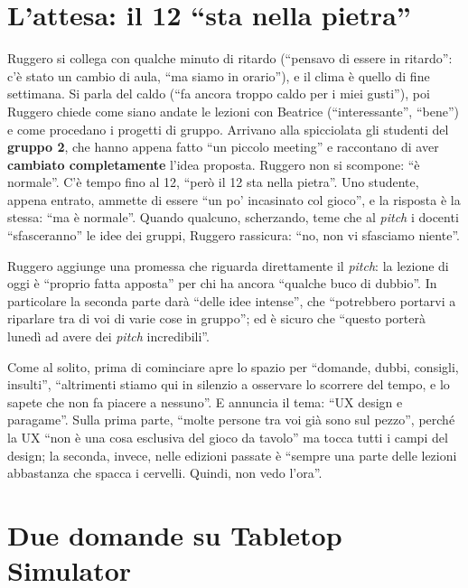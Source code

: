\section{L'attesa: il 12 ``sta nella pietra''}
\label{a10:sec:attesa}

Ruggero si collega con qualche minuto di ritardo (``pensavo di essere in ritardo'':
c'è stato un cambio di aula, ``ma siamo in orario''), e il clima è quello di fine
settimana. Si parla del caldo (``fa ancora troppo caldo per i miei gusti''), poi
Ruggero chiede come siano andate le lezioni con Beatrice (``interessante'',
``bene'') e come procedano i progetti di gruppo. Arrivano alla spicciolata gli
studenti del \textbf{gruppo 2}, che hanno appena fatto ``un piccolo meeting'' e
raccontano di aver \textbf{cambiato completamente} l'idea proposta. Ruggero non si
scompone: ``è normale''. C'è tempo fino al 12, ``però il 12 sta nella pietra''. Uno
studente, appena entrato, ammette di essere ``un po' incasinato col gioco'', e la
risposta è la stessa: ``ma è normale''. Quando qualcuno, scherzando, teme che al
\emph{pitch} i docenti ``sfasceranno'' le idee dei gruppi, Ruggero rassicura: ``no, non
vi sfasciamo niente''.

Ruggero aggiunge una promessa che riguarda direttamente il \emph{pitch}: la lezione
di oggi è ``proprio fatta apposta'' per chi ha ancora ``qualche buco di dubbio''. In
particolare la seconda parte darà ``delle idee intense'', che ``potrebbero portarvi a
riparlare tra di voi di varie cose in gruppo''; ed è sicuro che ``questo porterà lunedì
ad avere dei \emph{pitch} incredibili''.

Come al solito, prima di cominciare apre lo spazio per ``domande, dubbi, consigli,
insulti'', ``altrimenti stiamo qui in silenzio a osservare lo scorrere del tempo, e lo
sapete che non fa piacere a nessuno''. E annuncia il tema: ``UX design e paragame''.
Sulla prima parte, ``molte persone tra voi già sono sul pezzo'', perché la UX ``non è
una cosa esclusiva del gioco da tavolo'' ma tocca tutti i campi del design; la seconda,
invece, nelle edizioni passate è ``sempre una parte delle lezioni abbastanza che spacca
i cervelli. Quindi, non vedo l'ora''.

\section{Due domande su Tabletop Simulator}
\label{a10:sec:tts}

